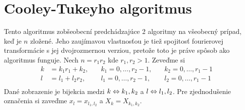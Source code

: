 \section{Cooley-Tukeyho algoritmus}
Tento algoritmus zobšeobecní predchádzajúce 2 algoritmy na
všeobecný prípad, keď je $n$ zložené. Jeho zaujímavou vlastnosťou je
tiež spojitosť fourierovej transformácie s jej dvojrozmernou verziou,
pretože toto je práve spôsob ako algoritmus funguje.
Nech $n=r_1 r_2$ kde $r_1,r_2>1$.
Zeveďme si
\begin{align}
    k &= k_1 r_1 + k_2, \quad &k_1 = 0,\dots,r_2-1, 
                \quad &k_2 = 0,\dots,r_1-1 \\
    l &= l_1  + l_2 r_2, \quad &l_1 = 0,\dots,r_2-1, 
                \quad &l_2 = 0,\dots,r_1-1 \\
\end{align}
Dané zobrazenie je bijekcia medzi $k \Leftrightarrow k_1,k_2$ a
$l \Leftrightarrow l_1,l_2$.
Pre zjednodušenie označenia si zaveďme $x_l = x_{l_1,l_2}$ a
$X_k = X_{k_1,k_2}$.

